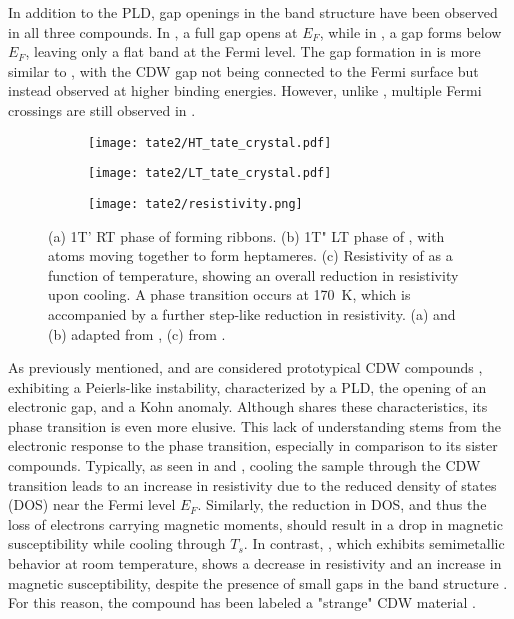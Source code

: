 In addition to the PLD, gap openings in the band structure have been observed in all three compounds.
In , a full gap opens at $E_F$, while in , a gap forms below $E_F$, leaving only a flat band at the Fermi level.
The gap formation in  is more similar to , with the CDW gap not being connected to the Fermi surface but instead observed at higher binding energies.
However, unlike , multiple Fermi crossings are still observed in  \cite{lin_evidence_2022, mitsuishi_unveiling_2024}.

\begin{figure}
	\centering
	\begin{subfigure}[b]{0.3\textwidth}
		\texttt{[image: tate2/HT\_tate\_crystal.pdf]}
		\caption{}
	\end{subfigure}
	\hfill
	\begin{subfigure}[b]{0.3\textwidth}
		\texttt{[image: tate2/LT\_tate\_crystal.pdf]}
		\caption{}
	\end{subfigure}
	\hfill
	\begin{subfigure}[b]{0.3\textwidth}
		\texttt{[image: tate2/resistivity.png]}
		\caption{}
	\end{subfigure}
	\caption{(a) 1T' RT phase of  forming ribbons. (b) 1T" LT phase of , with  atoms moving together to form heptameres. (c) Resistivity of  as a function of temperature, showing an overall reduction in resistivity upon cooling. A phase transition occurs at \qty{170}{\kelvin}, which is accompanied by a further step-like reduction in resistivity. (a) and (b) adapted from \cite{lin_evidence_2022}, (c) from \cite{hu_optical_2022}.}
	\label{fig:tate_structure}
\end{figure}

As previously mentioned,  and  are considered prototypical CDW compounds \cite{bozin_crystallization_2023, shen_precursor_2023}, exhibiting a Peierls-like instability, characterized by a PLD, the opening of an electronic gap, and a Kohn anomaly.
Although  shares these characteristics, its phase transition is even more elusive.
This lack of understanding stems from the electronic response to the phase transition, especially in comparison to its  sister compounds.
Typically, as seen in  and , cooling the sample through the CDW transition leads to an increase in resistivity due to the reduced density of states (DOS) near the Fermi level $E_F$.
Similarly, the reduction in DOS, and thus the loss of electrons carrying magnetic moments, should result in a drop in magnetic susceptibility while cooling through $T_s$.
In contrast, , which exhibits semimetallic behavior at room temperature, shows a decrease in resistivity and an increase in magnetic susceptibility, despite the presence of small gaps in the band structure \cite{sorgel_new_2006,hu_optical_2022,lin_evidence_2022}.
For this reason, the compound has been labeled a "strange" CDW material \cite{lin_evidence_2022}.

